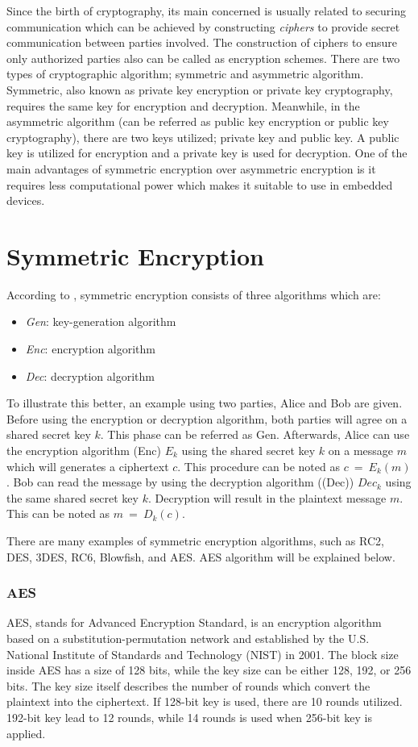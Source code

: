 Since the birth of cryptography, its main concerned is usually related to securing communication which can be achieved by constructing \textit{ciphers} to provide secret communication between parties involved. The construction of ciphers to ensure only authorized parties also can be called as encryption schemes.
There are two types of cryptographic algorithm; symmetric and asymmetric algorithm. Symmetric, also known as private key encryption or private key cryptography, requires the same key for encryption and decryption. Meanwhile, in the asymmetric algorithm (can be referred as public key encryption or public key cryptography), there are two keys utilized; private key and public key. A public key is utilized for encryption and a private key is used for decryption. One of the main advantages of symmetric encryption over asymmetric encryption is it requires less computational power which makes it suitable to use in embedded devices.

\section{Symmetric Encryption}

According to \cite{modern_cryptography}, symmetric encryption consists of three algorithms which are:
\begin{itemize}
    \item \large{\textit{Gen}}: key-generation algorithm
    \item \large{\textit{Enc}}: encryption algorithm
    \item \large{\textit{Dec}}: decryption algorithm
\end{itemize}
To illustrate this better, an example using two parties, Alice and Bob are given. Before using the encryption or decryption algorithm, both parties will agree on a shared secret key $k$. This phase can be referred as \large{Gen}.
Afterwards, Alice can use the encryption algorithm (\large{Enc}) $E_k$ using the shared secret key $k$ on a message $m$ which will generates a ciphertext $c$. This procedure can be noted as $c\ =\ E_k(m)$. Bob can read the message by using the decryption algorithm (\large(Dec)) $Dec_k$ using the same shared secret key $k$. Decryption will result in the plaintext message $m$. This can be noted as $m\ =\ D_k(c)$.


There are many examples of symmetric encryption algorithms, such as RC2, DES, 3DES, RC6, Blowfish, and AES. AES algorithm will be explained below.

\subsubsection{AES}
AES, stands for Advanced Encryption Standard, is an encryption algorithm based on a substitution-permutation network and established by the U.S. National Institute of Standards and Technology (NIST) in 2001.
The block size inside AES has a size of 128 bits, while the key size can be either 128, 192, or 256 bits. The key size  itself describes the number of rounds which convert the plaintext into the ciphertext. If 128-bit key is used, there are 10 rounds utilized. 192-bit key lead to 12 rounds, while 14 rounds is used when 256-bit key is applied.


